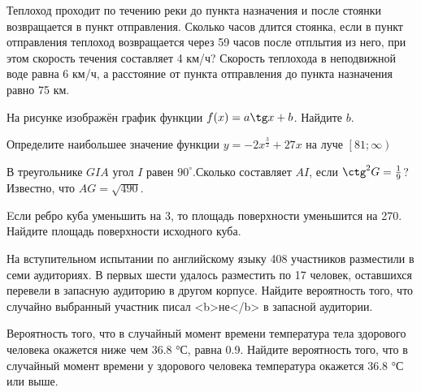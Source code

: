\documentclass[twocolumn]{article}
\begin{document}
\begin{taskBN}{9}
Теплоход проходит по течению реки до пункта назначения и после стоянки возвращается в пункт отправления. Сколько часов длится стоянка, если в пункт отправления теплоход возвращается через 59 часов после отплытия из него, при этом скорость течения составляет 4 км/ч? Скорость теплохода в неподвижной воде равна 6 км/ч, а расстояние от пункта отправления до пункта назначения равно 75 км. 
\end{taskBN}

\begin{taskBN}{10}
На рисунке изображён график функции $f(x)=a\tg x+b$. Найдите $b$.\vspace{2.5cm}
\end{taskBN}

\begin{taskBN}{11}
Определите наибольшее значение функции $y = -2x^{\frac{3}{2}}+27x$ на луче $\left[81;\infty \right)$
\end{taskBN}




\cleardoublepage
\def\examvart{Вариант 17.2}
\normalsize

\startpartone
\large




\begin{taskBN}{1}
В треугольнике $GIA$ угол $I$ равен $90^\circ$.Сколько составляет  $AI$, если $\ctg^2{G}=\frac{1}{9}$? Известно, что  $AG=\sqrt{490}$. 
\end{taskBN}

\begin{taskBN}{2}
Eсли ребро куба уменьшить на 3, то площадь поверхности уменьшится на 270. Найдите площадь поверхности исходного куба.\vspace{2.5cm}
\end{taskBN}

\begin{taskBN}{3}
На вступительном испытании по английскому языку 408 участников разместили в семи аудиториях. В первых шести удалось разместить по 17 человек, оставшихся перевели в запасную аудиторию в другом корпусе. Найдите вероятность того, что случайно выбранный участник писал <b>не</b> в запасной аудитории.
\end{taskBN}

\begin{taskBN}{4}
Вероятность того, что в случайный момент времени температура тела здорового человека окажется ниже чем 36.8 °С, равна 0.9. Найдите вероятность того, что в случайный момент времени у здорового человека температура окажется 36.8 °С или выше.
\end{taskBN}
\end{document}
